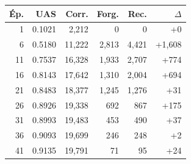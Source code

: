 \begin{table}[ht]
\hfill
\begin{minipage}[t]{0.42\linewidth}
\centering\tiny
\begin{tabular}{rrrrrr}
\toprule
\textbf{Ép.} & \textbf{UAS} & \textbf{Corr.} & \textbf{Forg.} & \textbf{Rec.} & \textbf{$\Delta$} \\
\midrule
1 & 0.1021 & 2,212 & 0 & 0 & +0 \\
6 & 0.5180 & 11,222 & 2,813 & 4,421 & +1,608 \\
11 & 0.7537 & 16,328 & 1,933 & 2,707 & +774 \\
16 & 0.8143 & 17,642 & 1,310 & 2,004 & +694 \\
21 & 0.8483 & 18,377 & 1,245 & 1,276 & +31 \\
26 & 0.8926 & 19,338 & 692 & 867 & +175 \\
31 & 0.8993 & 19,483 & 453 & 490 & +37 \\
36 & 0.9093 & 19,699 & 246 & 248 & +2 \\
41 & 0.9135 & 19,791 & 71 & 95 & +24 \\
\bottomrule
\end{tabular}
\end{minipage}
\end{table}
